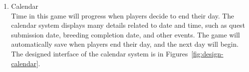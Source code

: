\documentclass[12pt,oneside,openright,a4paper]{cpe-english-project}
\begin{document}
\begin{itemize}
\begin{itemize}
\begin{enumerate}
		\item Calendar \\
		Time in this game will progress when players decide to end their day. The calendar system displays many details related to date and time, such as quest submission date, breeding completion date, and other events. The game will automatically save when players end their day, and the next day will begin. The designed interface of the calendar system is in Figures~\ref{fig:design-calendar}. \\
		\begin{minipage}[c]{\textwidth}\centering
		\label{fig:design-calendar}
		\end{minipage}
		\end{enumerate}
	\end{itemize}

	




\end{itemize}
\end{document}
